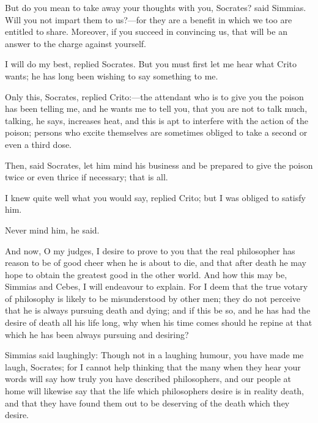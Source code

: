 \documentclass[11pt,letter]{article}
\begin{document}
\par  But do you mean to take away your thoughts with you, Socrates? said Simmias. Will you not impart them to us?—for they are a benefit in which we too are entitled to share. Moreover, if you succeed in convincing us, that will be an answer to the charge against yourself.

\par  I will do my best, replied Socrates. But you must first let me hear what Crito wants; he has long been wishing to say something to me.

\par  Only this, Socrates, replied Crito:—the attendant who is to give you the poison has been telling me, and he wants me to tell you, that you are not to talk much, talking, he says, increases heat, and this is apt to interfere with the action of the poison; persons who excite themselves are sometimes obliged to take a second or even a third dose.

\par  Then, said Socrates, let him mind his business and be prepared to give the poison twice or even thrice if necessary; that is all.

\par  I knew quite well what you would say, replied Crito; but I was obliged to satisfy him.

\par  Never mind him, he said.

\par  And now, O my judges, I desire to prove to you that the real philosopher has reason to be of good cheer when he is about to die, and that after death he may hope to obtain the greatest good in the other world. And how this may be, Simmias and Cebes, I will endeavour to explain. For I deem that the true votary of philosophy is likely to be misunderstood by other men; they do not perceive that he is always pursuing death and dying; and if this be so, and he has had the desire of death all his life long, why when his time comes should he repine at that which he has been always pursuing and desiring?

\par  Simmias said laughingly: Though not in a laughing humour, you have made me laugh, Socrates; for I cannot help thinking that the many when they hear your words will say how truly you have described philosophers, and our people at home will likewise say that the life which philosophers desire is in reality death, and that they have found them out to be deserving of the death which they desire.
\end{document}

